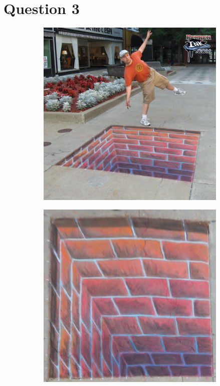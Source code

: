 \documentclass{article}
\begin{document}
\section{Question 3}
\begin{figure}[H]
    \centering
    \begin{subfigure}{.3\textwidth}
        \centering
        \includegraphics[scale=0.2]{q3/bricks.jpg}
    \end{subfigure}
    \begin{subfigure}{.3\textwidth}
        \centering
        \includegraphics[scale=0.2]{q3/output.jpg}
        \label{fig 1}
    \end{subfigure}
\end{figure}
\end{document}
